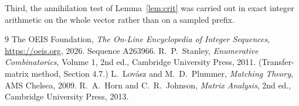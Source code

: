\documentclass[11pt,a4paper]{article}
\theoremstyle{plain}
\theoremstyle{definition}
\begin{document}
Third, the annihilation test of Lemma~\ref{lem:crit} was carried out in exact integer
arithmetic on the whole vector rather than on a sampled prefix.

\begin{thebibliography}{9}
 The OEIS Foundation, \emph{The On-Line Encyclopedia of Integer
Sequences}, \url{https://oeis.org}, 2026. Sequence A263966.
 R.~P.~Stanley, \emph{Enumerative Combinatorics}, Volume 1, 2nd ed.,
Cambridge University Press, 2011. (Transfer-matrix method, Section 4.7.)
 L.~Lov\'asz and M.~D.~Plummer, \emph{Matching Theory}, AMS Chelsea, 2009.
 R.~A.~Horn and C.~R.~Johnson, \emph{Matrix Analysis}, 2nd ed., Cambridge
University Press, 2013.
\end{thebibliography}
\end{document}

